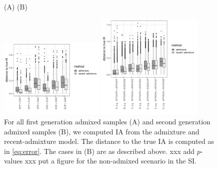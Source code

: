 \documentclass[12pt]{article}
\theoremstyle{definition}
\begin{document}
\begin{figure}[htb]
  \hspace{3cm} (A) \hspace{8cm} (B)
  \begin{center}
    \parbox[b]{0.45\textwidth}{\includegraphics[width=0.45\textwidth]{deviations_mixed_EUROFORGEN.pdf}\vspace{2cm}}
    \hspace{1cm}
    \parbox[b]{0.45\textwidth}{\includegraphics[width=0.45\textwidth]{deviations_mixed_cases_EUROFORGEN.pdf}}
  \end{center}
  \caption{\label{fig:mixed_cases_EUROFORGEN} For all first generation
    admixed samples (A) and second generation admixed samples (B), we
    computed IA from the admixture and recent-admixture model. The
    distance to the true IA is computed as in \eqref{eq:error}. The
    cases in (B) are as described above. xxx add $p$-values xxx put a
    figure for the non-admixed scenario in the SI.}
\end{figure}
\end{document}

